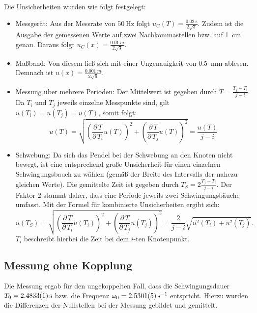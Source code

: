 \documentclass[11pt,a4paper,titlepage, ngerman]{article}
\begin{document}
			Die Unsicherheiten wurden wie folgt festgelegt:
			\begin{itemize}
				\item Messgerät: Aus der Messrate von $\SI{50}{\hertz}$ folgt $u_C(T) = \frac{\SI{0,02}{\second}}{2\sqrt{3}}$.
				Zudem ist die Ausgabe der gemessenen Werte auf zwei Nachkommastellen bzw. auf \SI{1}{\cm} genau. Daraus folgt $u_C(x) = \frac{\SI{0,01}{m}}{2\sqrt{3}}$.
				\item Maßband: Von diesem ließ sich mit einer Ungenauigkeit von \SI{0,5}{mm} ablesen. Demnach ist $u(x) = \frac{\SI{0,001}{m}}{2\sqrt{6}}$.
				\item Messung über mehrere Perioden: Der Mittelwert ist gegeben durch $T = \frac{T_j - T_i}{j-i}$.
				Da $T_i$ und $T_j$ jeweils einzelne Messpunkte sind, gilt $u(T_i) = u(T_j) = u(T)$, somit folgt:
				\begin{equation}
					u(T) = \sqrt{\left( \frac{\partial\, T}{\partial\, T_i} u(T)\right)^2 + \left( \frac{\partial\, T}{\partial\, T_j} u(T)\right)^2}
					=\frac{u(T)}{j-i}
				\end{equation}
				\item Schwebung: Da sich das Pendel bei der Schwebung an den Knoten nicht bewegt, ist eine entsprechend große Unsicherheit für einen einzelnen Schwingungsbauch zu wählen (gemäß der Breite des Intervalls der nahezu gleichen Werte).
				Die gemittelte Zeit ist gegeben durch $T_S = 2\frac{T_j - T_i}{j-i}$. Der Faktor $2$ stammt daher, dass eine Periode jeweils zwei Schwingungsbäuche umfasst.
				Mit der Formel für kombinierte Unsicherheiten ergibt sich:
				\begin{equation}
					u(T_S) = \sqrt{\left( \frac{\partial\, T}{\partial\, T_i} u(T_i)\right)^2 + \left( \frac{\partial\, T}{\partial\, T_j} u(T_j)\right)^2}
					=\frac{2}{j-i} \sqrt{u^2(T_i) + u^2(T_j)}.
				\end{equation}
				$T_i$ beschreibt hierbei die Zeit bei dem $i$-ten Knotenpunkt.
			\end{itemize}
			
		\subsection{Messung ohne Kopplung}
										
			Die Messung ergab für den ungekoppelten Fall, dass die Schwingungsdauer $T_0 = \SI{2,4833 +- 0,0001}{\second}$ bzw. die Frequenz $\omega_0 = \SI{2,5301 +- 0,0005}{\s^{-1}}$ entspricht. Hierzu wurden die Differenzen der Nullstellen bei der Messung gebildet und gemittelt. 
			
\end{document}
